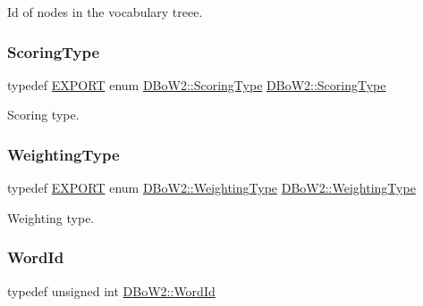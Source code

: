 Id of nodes in the vocabulary treee. 

\mbox{\label{namespace_d_bo_w2_ad047d6578eacc8aaae7d9cbcd3ded537}} 
\subsubsection{\texorpdfstring{Scoring\+Type}{ScoringType}}
{\footnotesize\ttfamily typedef \mbox{\hyperlink{config_8h_a3472d8cdbb788d5f1815b3522595bc49}{E\+X\+P\+O\+RT}} enum \mbox{\hyperlink{namespace_d_bo_w2_aa252a592dd607c6e60dede06ceef2722}{D\+Bo\+W2\+::\+Scoring\+Type}}  \mbox{\hyperlink{namespace_d_bo_w2_aa252a592dd607c6e60dede06ceef2722}{D\+Bo\+W2\+::\+Scoring\+Type}}}



Scoring type. 

\mbox{\label{namespace_d_bo_w2_a66be5c3cd2567ff15eeaf56fd55fffcc}} 
\subsubsection{\texorpdfstring{Weighting\+Type}{WeightingType}}
{\footnotesize\ttfamily typedef \mbox{\hyperlink{config_8h_a3472d8cdbb788d5f1815b3522595bc49}{E\+X\+P\+O\+RT}} enum \mbox{\hyperlink{namespace_d_bo_w2_a5de5c8a307aca9a84ffefda2a9bc467a}{D\+Bo\+W2\+::\+Weighting\+Type}}  \mbox{\hyperlink{namespace_d_bo_w2_a5de5c8a307aca9a84ffefda2a9bc467a}{D\+Bo\+W2\+::\+Weighting\+Type}}}



Weighting type. 

\mbox{\label{namespace_d_bo_w2_ab1a0d3283b2d4690a383372ed20bfeb5}} 
\subsubsection{\texorpdfstring{Word\+Id}{WordId}}
{\footnotesize\ttfamily typedef unsigned int \mbox{\hyperlink{namespace_d_bo_w2_ab1a0d3283b2d4690a383372ed20bfeb5}{D\+Bo\+W2\+::\+Word\+Id}}}



